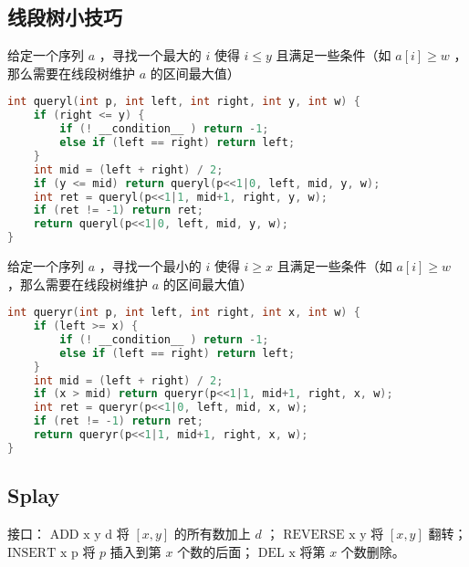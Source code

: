 \documentclass{article}
\begin{document}
\subsection{线段树小技巧}
给定一个序列 $a$ ，寻找一个最大的 $i$ 使得 $i \leq y$ 且满足一些条件（如 $a[i] \geq w$ ，那么需要在线段树维护 $a$ 的区间最大值）
\begin{lstlisting}[language=C++]
int queryl(int p, int left, int right, int y, int w) {
	if (right <= y) {
		if (! __condition__ ) return -1;
		else if (left == right) return left;
	}
	int mid = (left + right) / 2;
	if (y <= mid) return queryl(p<<1|0, left, mid, y, w);
	int ret = queryl(p<<1|1, mid+1, right, y, w);
	if (ret != -1) return ret;
	return queryl(p<<1|0, left, mid, y, w);
}
\end{lstlisting}
给定一个序列 $a$ ，寻找一个最小的 $i$ 使得 $i \geq x$ 且满足一些条件（如 $a[i] \geq w$ ，那么需要在线段树维护 $a$ 的区间最大值）
\begin{lstlisting}[language=C++]
int queryr(int p, int left, int right, int x, int w) {
	if (left >= x) {
		if (! __condition__ ) return -1;
		else if (left == right) return left;
	}
	int mid = (left + right) / 2;
	if (x > mid) return queryr(p<<1|1, mid+1, right, x, w);
	int ret = queryr(p<<1|0, left, mid, x, w);
	if (ret != -1) return ret;
	return queryr(p<<1|1, mid+1, right, x, w);
}
\end{lstlisting}
\subsection{Splay}

接口： 
 $\text{ADD x y d}$ 将 $[x, y]$ 的所有数加上 $d$ ；
 $\text{REVERSE x y}$  将 $[x, y]$ 翻转；
 $\text{INSERT x p}$ 将 $p$ 插入到第 $x$ 个数的后面；
 $\text{DEL x}$ 将第 $x$ 个数删除。
\end{document}

